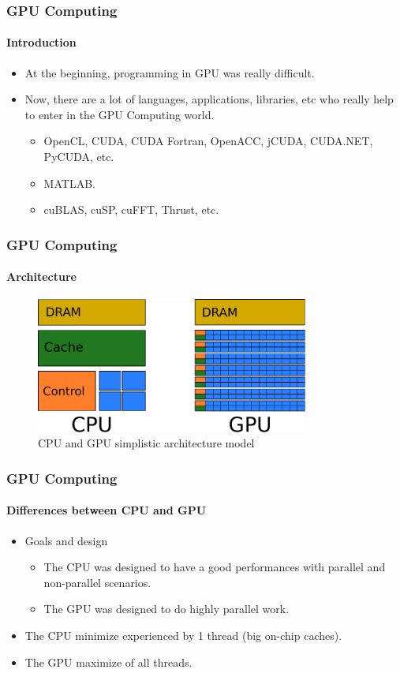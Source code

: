 \begin{frame}
    \frametitle{GPU Computing}
    \framesubtitle{Introduction}
    \begin{itemize}
        \item At the beginning, programming in GPU was really difficult.
        \item Now, there are a lot of languages, applications, libraries, etc
            who really help to enter in the GPU Computing world.
        \begin{itemize}
            \item OpenCL, CUDA, CUDA Fortran, OpenACC, jCUDA, CUDA.NET, PyCUDA, etc.
            \item MATLAB.
            \item cuBLAS, cuSP, cuFFT, Thrust, etc.
        \end{itemize}
    \end{itemize}
\end{frame}

\begin{frame}
    \frametitle{GPU Computing}
    \framesubtitle{Architecture}
    \begin{figure}
        \centering
        \label{fig:architecture}
        \includegraphics[width=0.8\textwidth]{img/architecture.pdf}
        \caption{CPU and GPU simplistic architecture model}
    \end{figure}
\end{frame}

\begin{frame}
    \frametitle{GPU Computing}
    \framesubtitle{Differences between CPU and GPU}
    \begin{itemize}
        \item Goals and design
        \begin{itemize}
            \item The CPU was designed to have a good performances with parallel and non-parallel
                  scenarios.
            \item The GPU was designed to do highly parallel work.
        \end{itemize}
        \item The CPU minimize  experienced by 1 thread (big on-chip caches).
        \item The GPU maximize  of all threads.
    \end{itemize}
\end{frame}

